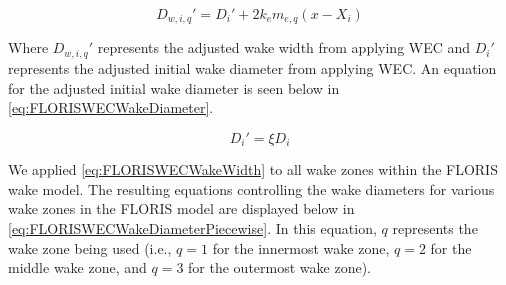 \documentclass[a4paper]{jpconf}
\begin{document}
\begin{equation}
    D_{w,i,q}' = D_i' + 2k_em_{e,q}(x - X_i)
    \label{eq:FLORISWECWakeWidth}
\end{equation}

Where $D_{w,i,q}'$ represents the adjusted wake width from applying WEC and $D_i'$ represents the adjusted initial wake diameter from applying WEC. An equation for the adjusted initial wake diameter is seen below in \cref{eq:FLORISWECWakeDiameter}.

\begin{equation}
    D_i' = \xi D_i
    \label{eq:FLORISWECWakeDiameter}
\end{equation}



We applied \cref{eq:FLORISWECWakeWidth} to all wake zones within the FLORIS wake model. The resulting equations controlling the wake diameters for various wake zones in the FLORIS model are displayed below in \cref{eq:FLORISWECWakeDiameterPiecewise}. In this equation, $q$ represents the wake zone being used (i.e., $q = 1$ for the innermost wake zone, $q = 2$ for the middle wake zone, and $q = 3$ for the outermost wake zone).
\end{document}
